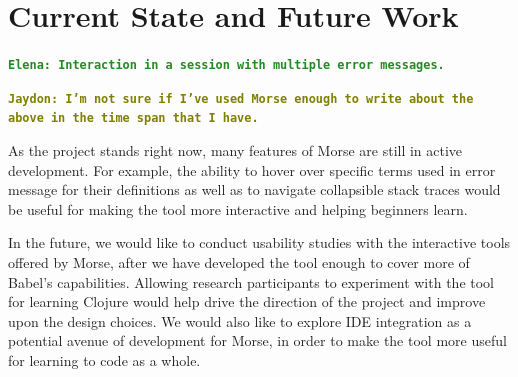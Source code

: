 \documentclass[12pt]{article}
\newcommand{\comment}[1]{{\bf \tt  {#1}}}
\newcommand{\emcomment}[1]{\textcolor{ForestGreen}{\comment{Elena: {#1}}}}
\newcommand{\jscomment}[1]{\textcolor{olive}{\comment{Jaydon: {#1}}}}
\begin{document}
\section{Current State and Future Work}\label{sec:conclusion}

\emcomment{Interaction in a session with multiple error messages.}

\jscomment{I'm not sure if I've used Morse enough to write about the above in the time span that I have.}

As the project stands right now, many features of Morse are still in active development. For example, the ability to hover over specific terms used in error message for their definitions as well as to navigate collapsible stack traces would be useful for making the tool more interactive and helping beginners learn.

In the future, we would like to conduct usability studies with the interactive tools offered by Morse, after we have developed the tool enough to cover more of Babel's capabilities. Allowing research participants to experiment with the tool for learning Clojure would help drive the direction of the project and improve upon the design choices. We would also like to explore IDE integration as a potential avenue of development for Morse, in order to make the tool more useful for learning to code as a whole.



\end{document}
